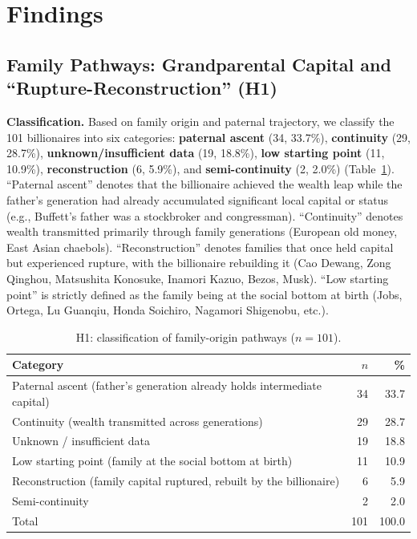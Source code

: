 \documentclass[11pt,a4paper]{article}
\begin{document}
\section{Findings}
\label{sec:findings}

\subsection{Family Pathways: Grandparental Capital and ``Rupture-Reconstruction'' (H1)}

\textbf{Classification.} Based on family origin and paternal trajectory, we classify the 101 billionaires into six categories: \textbf{paternal ascent} (34, 33.7\%), \textbf{continuity} (29, 28.7\%), \textbf{unknown/insufficient data} (19, 18.8\%), \textbf{low starting point} (11, 10.9\%), \textbf{reconstruction} (6, 5.9\%), and \textbf{semi-continuity} (2, 2.0\%) (Table~\ref{tab:h1}). ``Paternal ascent'' denotes that the billionaire achieved the wealth leap while the father's generation had already accumulated significant local capital or status (e.g., Buffett's father was a stockbroker and congressman). ``Continuity'' denotes wealth transmitted primarily through family generations (European old money, East Asian chaebols). ``Reconstruction'' denotes families that once held capital but experienced rupture, with the billionaire rebuilding it (Cao Dewang, Zong Qinghou, Matsushita Konosuke, Inamori Kazuo, Bezos, Musk). ``Low starting point'' is strictly defined as the family being at the social bottom at birth (Jobs, Ortega, Lu Guanqiu, Honda Soichiro, Nagamori Shigenobu, etc.).

\begin{table}[htbp]
\centering
\caption{H1: classification of family-origin pathways ($n=101$).}
\label{tab:h1}
\small
\begin{tabular}{lrr}
\toprule
Category & $n$ & \% \\
\midrule
Paternal ascent (father's generation already holds intermediate capital) & 34 & 33.7 \\
Continuity (wealth transmitted across generations) & 29 & 28.7 \\
Unknown / insufficient data & 19 & 18.8 \\
Low starting point (family at the social bottom at birth) & 11 & 10.9 \\
Reconstruction (family capital ruptured, rebuilt by the billionaire) & 6 & 5.9 \\
Semi-continuity & 2 & 2.0 \\
\midrule
Total & 101 & 100.0 \\
\bottomrule
\end{tabular}
\end{table}
\end{document}

